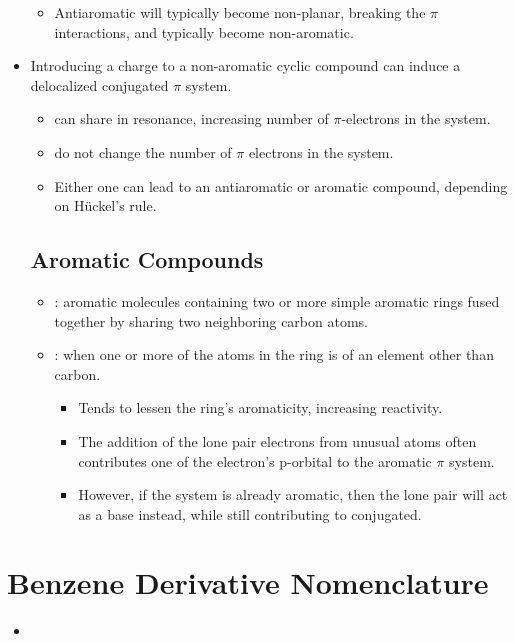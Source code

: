 \begin{itemize}
\begin{itemize}
      \item Antiaromatic will typically become non-planar, breaking the \(\pi \) interactions, and typically become non-aromatic.
    \end{itemize}
  \item Introducing a charge to a non-aromatic cyclic compound can induce a delocalized conjugated \(\pi \) system.
    \begin{itemize}
      \item {} can share in resonance, increasing number of \(\pi \)-electrons in the system.
      \item {} do not change the number of \(\pi \) electrons in the system.
      \item Either one can lead to an antiaromatic or aromatic compound, depending on H\"uckel's rule.
    \end{itemize}
  \subsection{Aromatic Compounds}\label{Aromatic Compounds}
  \begin{itemize}
      \item {}: aromatic molecules containing two or more simple aromatic rings fused together by sharing two neighboring carbon atoms.
      \item {}: when one or more of the atoms in the ring is of an element other than carbon.
        \begin{itemize}
          \item Tends to lessen the ring's aromaticity, increasing reactivity.
          \item The addition of the lone pair electrons from unusual atoms often contributes one of the electron's p-orbital to the aromatic \(\pi \) system. 
          \item However, if the system is already aromatic, then the lone pair will act as a base instead, while still contributing to conjugated.
        \end{itemize}
  \end{itemize}
  
\end{itemize}

\section{Benzene Derivative Nomenclature}\label{Benzene Derivative Nomenclature}
\begin{itemize}
  \item 
\end{itemize}
